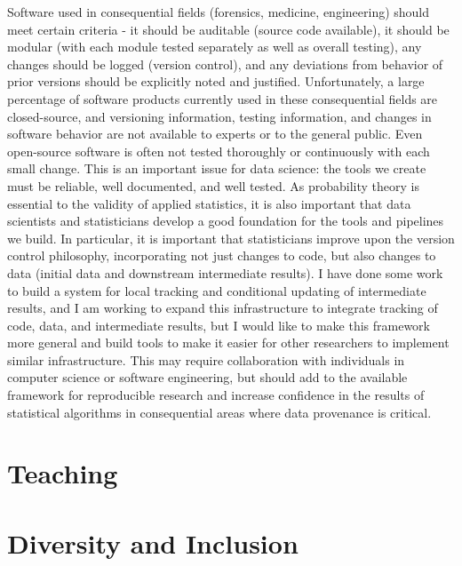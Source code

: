 \documentclass[12pt, letterpaper, sans]{moderncv}
\begin{document}
Software used in consequential fields (forensics, medicine, engineering) should meet certain criteria - it should be auditable (source code available), it should be modular (with each module tested separately as well as overall testing), any changes should be logged (version control), and any deviations from behavior of prior versions should be explicitly noted and justified. Unfortunately, a large percentage of software products currently used in these consequential fields are closed-source, and versioning information, testing information, and changes in software behavior are not available to experts or to the general public. Even open-source software is often not tested thoroughly or continuously with each small change. This is an important issue for data science: the tools we create must be reliable, well documented, and well tested. As probability theory is essential to the validity of applied statistics, it is also important that data scientists and statisticians develop a good foundation for the tools and pipelines we build. In particular, it is important that statisticians improve upon the version control philosophy, incorporating not just changes to code, but also changes to data (initial data and downstream intermediate results). I have done some work to build a system for local tracking and conditional updating of intermediate results, and I am working to expand this infrastructure to integrate tracking of code, data, and intermediate results, but I would like to make this framework more general and build tools to make it easier for other researchers to implement similar infrastructure. This may require collaboration with individuals in computer science or software engineering, but should add to the available framework for reproducible research and increase confidence in the results of statistical algorithms in consequential areas where data provenance is critical. 

\section{Teaching}



\section{Diversity and Inclusion}
\end{document}
